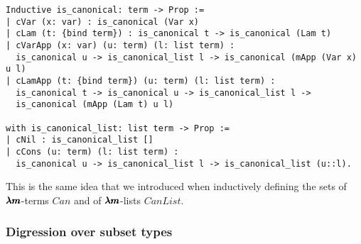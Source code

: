 \begin{lstlisting}[language=Coq]
Inductive is_canonical: term -> Prop :=
| cVar (x: var) : is_canonical (Var x)
| cLam (t: {bind term}) : is_canonical t -> is_canonical (Lam t)                                                      
| cVarApp (x: var) (u: term) (l: list term) :
  is_canonical u -> is_canonical_list l -> is_canonical (mApp (Var x) u l)
| cLamApp (t: {bind term}) (u: term) (l: list term) :
  is_canonical t -> is_canonical u -> is_canonical_list l ->
  is_canonical (mApp (Lam t) u l)
  
with is_canonical_list: list term -> Prop :=
| cNil : is_canonical_list []
| cCons (u: term) (l: list term) :
  is_canonical u -> is_canonical_list l -> is_canonical_list (u::l).
\end{lstlisting}

This is the same idea that we introduced when inductively defining the sets of $\pmb{\lambda m}$-terms $Can$ and of $\pmb{\lambda m}$-lists $CanList$.

\subsubsection{Digression over subset types}


